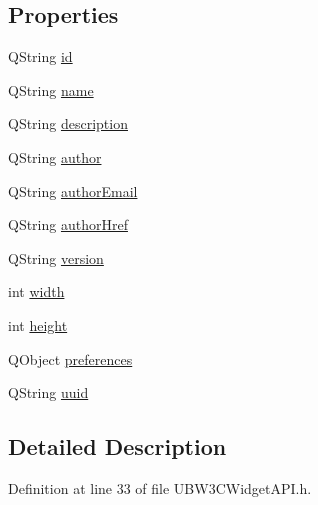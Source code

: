 \subsection*{Properties}
\begin{DoxyCompactItemize}
\item 
Q\-String \hyperlink{class_u_b_w3_c_widget_a_p_i_a9205ba93f7a146a20e0e1c5f7da6e842}{id}
\item 
Q\-String \hyperlink{class_u_b_w3_c_widget_a_p_i_a1e3515e5ad4b3b38c75880733b9bbd47}{name}
\item 
Q\-String \hyperlink{class_u_b_w3_c_widget_a_p_i_ab69c675b3b74d6b9c7368bd7ea3001bf}{description}
\item 
Q\-String \hyperlink{class_u_b_w3_c_widget_a_p_i_a49c7138ed218b64fdc14cc475515d415}{author}
\item 
Q\-String \hyperlink{class_u_b_w3_c_widget_a_p_i_aa8da17aa1b04a9de8d5b82f009cdaf9c}{author\-Email}
\item 
Q\-String \hyperlink{class_u_b_w3_c_widget_a_p_i_a665ac2b44329d6d6062194c9738681b4}{author\-Href}
\item 
Q\-String \hyperlink{class_u_b_w3_c_widget_a_p_i_a7147a7426ccf7fb7672d62b819253f1d}{version}
\item 
int \hyperlink{class_u_b_w3_c_widget_a_p_i_a13da541047433b72303ad1315cffb8e2}{width}
\item 
int \hyperlink{class_u_b_w3_c_widget_a_p_i_a66aaac9c6134b1a349652a8150601ff5}{height}
\item 
Q\-Object \hyperlink{class_u_b_w3_c_widget_a_p_i_a47520f530b1ee8b58bba5b33ee06d352}{preferences}
\item 
Q\-String \hyperlink{class_u_b_w3_c_widget_a_p_i_ae1f63491c93d254f18a642912e854963}{uuid}
\end{DoxyCompactItemize}


\subsection{Detailed Description}


Definition at line 33 of file U\-B\-W3\-C\-Widget\-A\-P\-I.\-h.



